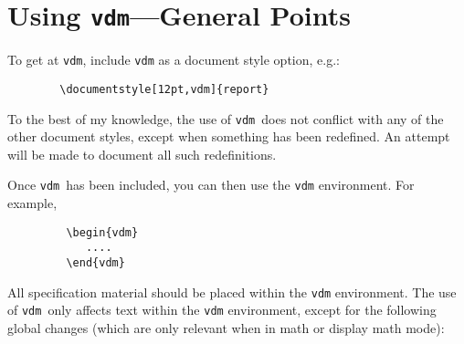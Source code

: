 \documentclass{article}
\newcommand{\Vdm}{{\tt vdm\/}}
\newenvironment{dangerous}{\par\vspace{5pt}\bgroup\small\noindent}%
                          {\par\egroup\vspace{5pt}}
\renewcommand{\^}[1]{$\langle${\rm #1\/}$\rangle$}
\begin{document}
\section{Using \Vdm---General Points}

To get at \Vdm, include {\tt vdm\/} as a document style option, e.g.:
\begin{verbatim}
        \documentstyle[12pt,vdm]{report}
\end{verbatim}
\begin{dangerous}
To the best of my knowledge, the use of \Vdm\ does not conflict with
any of the other document styles, except when something has been
redefined.   An attempt will be made to document all such redefinitions.
\end{dangerous}
Once \Vdm\ has been included, you can then use the {\tt vdm\/}
environment.  For example,
\begin{verbatim}
         \begin{vdm}
            ....
         \end{vdm}
\end{verbatim}
All specification material should be placed within the {\tt vdm\/}
environment.  The use of \Vdm\ only affects text within the {\tt vdm\/}
environment, except for the following global changes (which are only
relevant when in math or display math mode):
\end{document}
